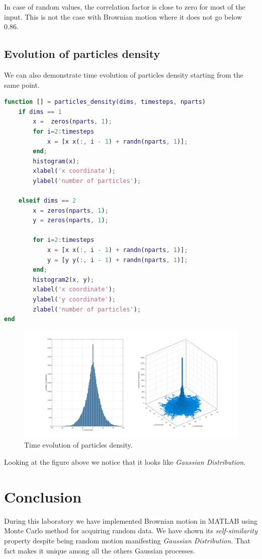 \documentclass[12pt]{article}
\begin{document}
In case of random values, the correlation factor is close to zero for most of the input. This is not the case with Brownian motion where it does not go below 0.86.

\subsection{Evolution of particles density}

We can also demonstrate time evolution of particles density starting from the same point.

\begin{lstlisting}[language=Matlab, caption = {Source code for particles density}]
function [] = particles_density(dims, timesteps, nparts)
	if dims == 1
		x =  zeros(nparts, 1);
		for i=2:timesteps
			x = [x x(:, i - 1) + randn(nparts, 1)];
		end;
		histogram(x);
		xlabel('x coordinate');
		ylabel('number of particles');

	elseif dims == 2
		x = zeros(nparts, 1);
		y = zeros(nparts, 1);

		for i=2:timesteps
			x = [x x(:, i - 1) + randn(nparts, 1)];
			y = [y y(:, i - 1) + randn(nparts, 1)];
		end;
		histogram2(x, y);
		xlabel('x coordinate');
		ylabel('y coordinate');
		zlabel('number of particles');
end
\end{lstlisting}

\begin{figure}[H]
	\centering
	\includegraphics[width=1.2\textwidth]{particles_density}
	\caption{Time evolution of particles density.}
\end{figure}

Looking at the figure above we notice that it looks like \textit{Gaussian Distribution}.


\section{Conclusion}

During this laboratory we have implemented Brownian motion in MATLAB using Monte Carlo method for acquiring random data. We have shown its \textit{self-similarity} property despite being random motion manifesting \textit{Gaussian Distribution}. That fact makes it unique among all the others Gaussian processes.
\end{document}
